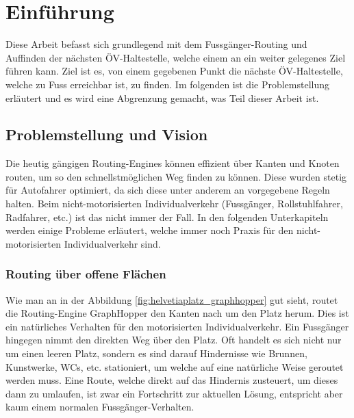 \section{Einführung}
\label{Einführung}
Diese Arbeit befasst sich grundlegend mit dem Fussgänger-Routing und Auffinden der nächsten ÖV-Haltestelle, welche einem an ein weiter gelegenes Ziel führen kann. Ziel ist es, von einem gegebenen Punkt die nächste ÖV-Haltestelle, welche zu Fuss erreichbar ist, zu finden. Im folgenden ist die Problemstellung erläutert und es wird eine Abgrenzung gemacht, was Teil dieser Arbeit ist.

\subsection{Problemstellung und Vision}
\label{Problemstellung und Vision}
Die heutig gängigen Routing-Engines können effizient über Kanten und Knoten routen, um so den schnellstmöglichen Weg finden zu können. Diese wurden stetig für Autofahrer optimiert, da sich diese unter anderem an vorgegebene Regeln halten. Beim nicht-motorisierten Individualverkehr (Fussgänger, Rollstuhlfahrer, Radfahrer, etc.)  ist das nicht immer der Fall. In den folgenden Unterkapiteln werden einige Probleme erläutert, welche immer noch Praxis für den nicht-motorisierten Individualverkehr sind.

\subsubsection{Routing über offene Flächen}
\label{problem:Routing über offene Flächen}
Wie man an in der Abbildung \ref{fig:helvetiaplatz_graphhopper} gut sieht, routet die Routing-Engine GraphHopper \cite{graphhopper} den Kanten nach um den Platz herum. Dies ist ein natürliches Verhalten für den motorisierten Individualverkehr. Ein Fussgänger hingegen nimmt den direkten Weg über den Platz. Oft handelt es sich nicht nur um einen leeren Platz, sondern es sind darauf Hindernisse wie Brunnen, Kunstwerke, WCs, etc. stationiert, um welche auf eine natürliche Weise geroutet werden muss. Eine Route, welche direkt auf das Hindernis zusteuert, um dieses dann zu umlaufen, ist zwar ein Fortschritt zur aktuellen Lösung, entspricht aber kaum einem normalen Fussgänger-Verhalten. 

